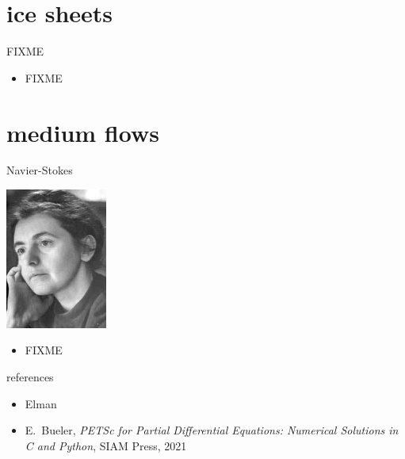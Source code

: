 \documentclass[10pt,hyperref,dvipsnames]{beamer}
\begin{document}
 
\section{ice sheets}

\begin{frame}{FIXME}

\begin{itemize}
\item FIXME
\end{itemize}
\end{frame}


\section{medium flows}

\begin{frame}{Navier-Stokes}

\hfill \includegraphics[width=0.25\textwidth]{figs/people/oladyzhenskaya.jpg}

\vspace{-20mm}
\begin{itemize}
\item FIXME
\end{itemize}
\end{frame}


\begin{frame}{references}
\begin{itemize}
\item Elman
\item E.~Bueler, \emph{PETSc for Partial Differential Equations: Numerical Solutions in C and Python}, SIAM Press, 2021
\end{itemize}
\end{frame}
\end{document}

